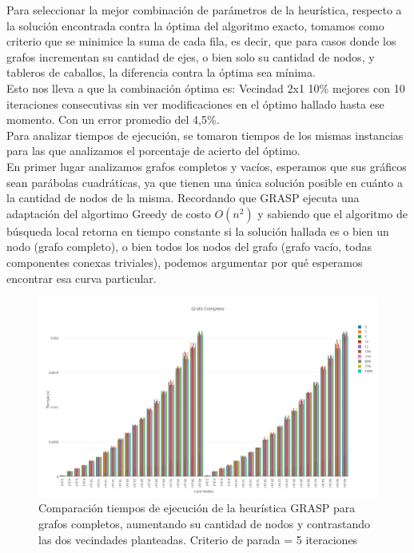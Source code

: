 \newpage

Para seleccionar la mejor combinaci\'on de par\'ametros de la heur\'istica, respecto a la soluci\'on encontrada contra la \'optima del algoritmo exacto, tomamos como criterio que se minimice la suma de cada fila, es decir, que para casos donde los grafos incrementan su cantidad de ejes, o bien solo su cantidad de nodos, y tableros de caballos, la diferencia contra la \'optima sea m\'inima.\\

Esto nos lleva a que la combinaci\'on \'optima es: Vecindad 2x1 10\% mejores con 10 iteraciones consecutivas sin ver modificaciones en el \'optimo hallado hasta ese momento. Con un error promedio del 4,5\%.\\

Para analizar tiempos de ejecuci\'on, se tomaron tiempos de los mismas instancias para las que analizamos el porcentaje de acierto del \'optimo.\\

En primer lugar analizamos grafos completos y vac\'ios, esperamos que sus gr\'aficos sean par\'abolas cuadr\'aticas, ya que tienen una \'unica soluci\'on posible en cu\'anto a la cantidad de nodos de la misma. Recordando que GRASP ejecuta una adaptaci\'on del algortimo Greedy de costo $O(n^2)$ y sabiendo que el algoritmo de b\'usqueda local retorna en tiempo constante si la soluci\'on hallada es o bien un nodo (grafo completo), o bien todos los nodos del grafo (grafo vac\'io, todas componentes conexas triviales), podemos argumentar por qu\'e esperamos encontrar esa curva particular.\\

  \begin{figure}[h!]
   \begin{center}
 	\includegraphics[scale=0.35]{imagenes/grasp/completo-5repes.png}
 	\caption{Comparaci\'on tiempos de ejecuci\'on de la heur\'istica GRASP para grafos completos, aumentando su cantidad de nodos y contrastando las dos vecindades planteadas. Criterio de parada = 5 iteraciones}
   \end{center}
 \end{figure}

